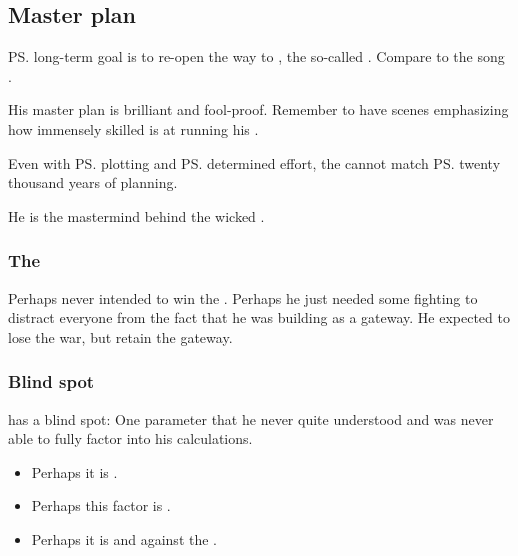 \subsection{Master plan}
\ps{\Daggerrain}{} long-term goal is to re-open the way to \Erebos, the so-called . Compare to the song . 

His master plan is brilliant and fool-proof. Remember to have scenes emphasizing how immensely skilled \Daggerrain{} is at running his . 

Even with \ps{\HriistD}{} plotting and \ps{\Ishnaruchaefir} determined effort, the \dragons{} cannot match \ps{\Daggerrain}{} twenty thousand years of planning. 

He is the mastermind behind the wicked . 





\subsubsection{The \firstbanewar}
Perhaps \Daggerrain{} never intended to win the \firstbanewar. Perhaps he just needed some fighting to distract everyone from the fact that he was building \Nyx{} as a gateway. He expected to lose the war, but retain the gateway. 





\subsubsection{Blind spot}
\Daggerrain{} has a blind spot: 
One parameter that he never quite understood and was never able to fully factor into his calculations. 

\begin{itemize}
  \item 
    Perhaps it is . 
  \item 
    Perhaps this factor is .
  \item 
    Perhaps it is  and  against the \banes.
\end{itemize}















